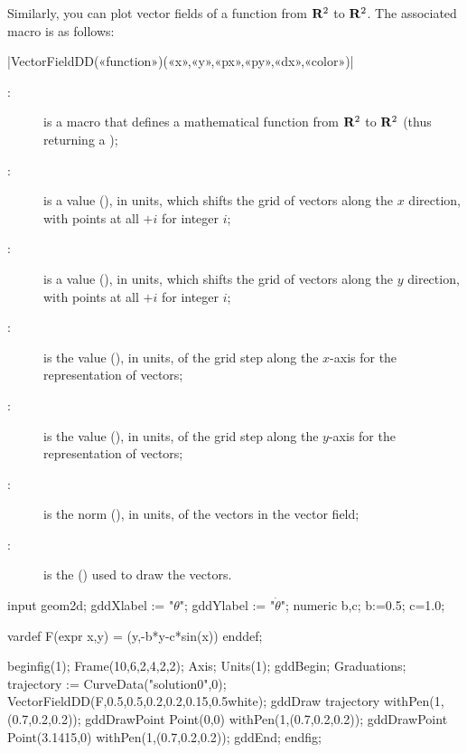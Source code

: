 \documentclass[a4paper,english]{article}
\begin{document}
Similarly, you can plot vector fields of a function from
$\mathbf{R}^2$ to $\mathbf{R}^2$. 
The associated macro is as follows:
\begin{colourband}
  \macro|VectorFieldDD(«function»)(«x»,«y»,«px»,«py»,«dx»,«color»)|
  \begin{description}
    \item[:] is a \MP{} macro that defines a mathematical function from $\mathbf{R}^2$ to $\mathbf{R}^2$ (thus returning a );
    \item[:] is a value (), in  units, which shifts the grid of vectors along the $x$ direction, with points at all $+i$ for integer $i$;
    \item[:] is a value (), in  units, which shifts the grid of vectors along the $y$ direction, with points at all $+i$ for integer $i$;
    \item[:] is the value (), in  units, of the grid step along the $x$-axis for the representation of vectors;
    \item[:] is the value (), in  units, of the grid step along the $y$-axis for the representation of vectors;
    \item[:] is the norm (), in  units, of the vectors in the vector field;
    \item[:] is the () used to draw the vectors.
  \end{description}
\end{colourband}


  \begin{ExempleMP}[sidebyside=false]
input geom2d;
gddXlabel := "$\theta$";
gddYlabel := "$\dot\theta$";
numeric b,c;
b:=0.5;
c=1.0;

vardef F(expr x,y) = (y,-b*y-c*sin(x)) enddef;

beginfig(1);
Frame(10,6,2,4,2,2);
Axis;
Units(1);
gddBegin;
Graduations;
trajectory := CurveData("solution0",0);
VectorFieldDD(F,0.5,0.5,0.2,0.2,0.15,0.5white);
gddDraw trajectory withPen(1,(0.7,0.2,0.2));
gddDrawPoint Point(0,0) withPen(1,(0.7,0.2,0.2));
gddDrawPoint Point(3.1415,0) withPen(1,(0.7,0.2,0.2));
gddEnd;
endfig;
\end{ExempleMP}
\end{document}
